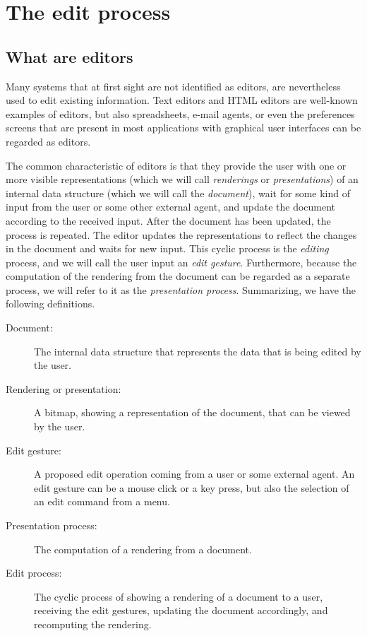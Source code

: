 \section{The edit process}
\label{problem}

{\bf }
\subsection{What are editors}


{\bf }Many systems that at first sight are not identified as editors, are nevertheless used to edit existing information. Text editors and HTML editors are well-known examples of editors, but also spreadsheets, e-mail agents, or even the preferences screens that are present in most applications with graphical user interfaces can be regarded as editors. 

The common characteristic of editors is that they provide the user with one or more visible representations (which we will call {\em renderings} or {\em presentations}) of an internal data structure (which we will call the {\em document}), wait for some kind of input from the user or some other external agent, and update the document according to the received input. After the document has been updated, the process is repeated. The editor updates the representations to reflect the changes in the document and waits for new input. This cyclic process is the {\em editing} process, and we will call the user input an {\em edit gesture}. Furthermore, because the computation of the rendering from the document can be regarded as a separate process, we will refer to it as the {\em presentation process}. Summarizing, we have the following definitions.
 \begin{description}
 
 \item[Document:]
 The internal data structure that represents the data that is being
          edited by the user.
 \item[Rendering or presentation: ]
 A bitmap, showing a representation of the document, that can be
          viewed by the user.
 \item[Edit gesture:]
A proposed edit operation coming from a user or some external
          agent. An edit gesture can be a mouse click or a key press, but also the
          selection of an edit command from a menu.
 \item[Presentation process:]
The computation of a rendering from a document.
 \item[Edit process:]
The cyclic process of showing a rendering of a document to a user,
          receiving the edit gestures, updating the document accordingly, and recomputing
          the rendering.
 \end{description}







